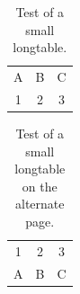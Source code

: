 \documentclass[letterpaper,12pt]{article}
\begin{document}
\begin{landscape}
\begin{longtable}{|>{\centering}p{1.02in}|>{\centering}p{1.15in}|>{\centering}p{1in}|>{\centering}p{0.7in}|>{\centering}p{0.7in}|>{\centering}p{0.67in}|>{\centering}p{2.55in}|}
\end{longtable}
\end{landscape}

\begin{landscape}
\begin{longtable}{|c|c|c|}
	\endfirsthead
	\caption{Test of a small longtable.} \\
	\hline
	A & B & C \\
	\hline
	1 & 2 & 3 \\
	\hline
\end{longtable}
\end{landscape}

\begin{landscape}
\begin{longtable}{|c|c|c|}
	\endfirsthead
	\caption{Test of a small longtable on the alternate page.} \\
	\hline
	1 & 2 & 3 \\
	\hline
	A & B & C \\
	\hline
\end{longtable}
\end{landscape}
\end{document}
